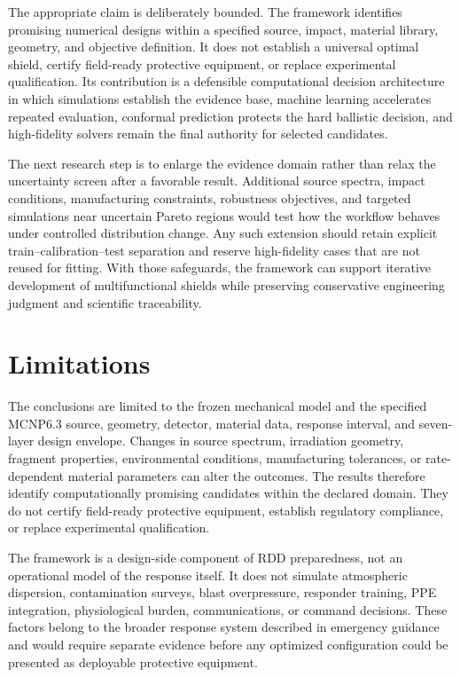 \documentclass[12pt]{elsarticle}
\begin{document}
	The appropriate claim is deliberately bounded. The framework identifies promising numerical designs within a specified source, impact, material library, geometry, and objective definition. It does not establish a universal optimal shield, certify field-ready protective equipment, or replace experimental qualification. Its contribution is a defensible computational decision architecture in which simulations establish the evidence base, machine learning accelerates repeated evaluation, conformal prediction protects the hard ballistic decision, and high-fidelity solvers remain the final authority for selected candidates.

	The next research step is to enlarge the evidence domain rather than relax the uncertainty screen after a favorable result. Additional source spectra, impact conditions, manufacturing constraints, robustness objectives, and targeted simulations near uncertain Pareto regions would test how the workflow behaves under controlled distribution change. Any such extension should retain explicit train--calibration--test separation and reserve high-fidelity cases that are not reused for fitting. With those safeguards, the framework can support iterative development of multifunctional shields while preserving conservative engineering judgment and scientific traceability.
	
	\section*{Limitations}

	The conclusions are limited to the frozen mechanical model and the specified MCNP6.3 source, geometry, detector, material data, response interval, and seven-layer design envelope. Changes in source spectrum, irradiation geometry, fragment properties, environmental conditions, manufacturing tolerances, or rate-dependent material parameters can alter the outcomes. The results therefore identify computationally promising candidates within the declared domain. They do not certify field-ready protective equipment, establish regulatory compliance, or replace experimental qualification.

	The framework is a design-side component of RDD preparedness, not an operational model of the response itself. It does not simulate atmospheric dispersion, contamination surveys, blast overpressure, responder training, PPE integration, physiological burden, communications, or command decisions. These factors belong to the broader response system described in emergency guidance and would require separate evidence before any optimized configuration could be presented as deployable protective equipment.
\end{document}

